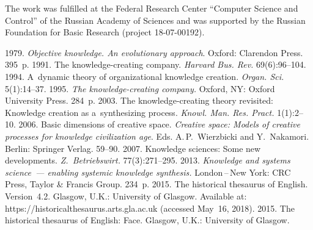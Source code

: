\Ack
\noindent
The work was fulfilled at the Federal Research Center ``Computer Science 
and Control'' of the Russian Academy of Sciences and was supported by the
Russian Foundation for Basic Research (project  
18-07-00192).




  \begin{multicols}{2}

\renewcommand{\bibname}{\protect\rmfamily References}

{\small\frenchspacing
 {%
 \begin{thebibliography}{99}
   1979. \textit{Objective knowledge. An evolutionary 
approach}. Oxford: Clarendon Press. 395~p.
   1991. The knowledge-creating company. \textit{Harvard 
Bus. Rev.} 69(6):96--104.
   1994. A~dynamic theory of organizational knowledge creation. 
\textit{Organ. Sci.} 5(1):14--37.
   1995. \textit{The knowledge-creating 
company.} Oxford, NY: Oxford University Press. 284~p.
   2003. The knowledge-creating theory 
revisited: Knowledge creation as a~synthesizing process. \textit{Knowl. 
Man. Res.  Pract.} 1(1):2--10.
   2006. Basic dimensions of creative 
space. \textit{Creative space: Models of creative processes for knowledge civilization 
age}. Eds. A.\,P.~Wierzbicki and Y.~Nakamori. Berlin: Springer Verlag. 59--90.
   2007. Knowledge sciences: Some 
new developments. \textit{Z.~Betriebswirt.} 77(3):271--295.
   2013. \textit{Knowledge and systems science~--- enabling 
systemic knowledge synthesis.} London\,--\,New York: CRC Press, Taylor \& Francis 
Group. 234~p.
   2015. The 
historical thesaurus of English. Version~4.2. Glasgow, U.K.: University of Glasgow. Available at: 
{\sf https://historicalthesaurus.arts.gla.ac.uk} (accessed May~16, 2018).
   2015. 
{The historical thesaurus of English: Face}. Glasgow, U.K.: University of Glasgow. 

\end{thebibliography}}}
\end{multicols}
